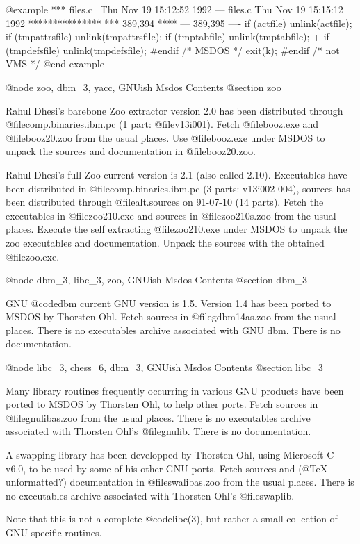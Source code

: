 @example
*** files.c~	Thu Nov 19 15:12:52 1992
--- files.c	Thu Nov 19 15:15:12 1992
***************
*** 389,394 ****
--- 389,395 ----
    if (actfile) unlink(actfile);
    if (tmpattrsfile) unlink(tmpattrsfile);
    if (tmptabfile) unlink(tmptabfile);
+   if (tmpdefsfile) unlink(tmpdefsfile);
  #endif /* MSDOS */
    exit(k);
  #endif /* not VMS */
@end example

@node zoo, dbm_3, yacc, GNUish Msdos Contents
@section zoo

Rahul Dhesi's barebone Zoo extractor version 2.0 has been distributed
through @file{comp.binaries.ibm.pc} (1 part: @file{v13i001}).  Fetch
@file{booz.exe} and @file{booz20.zoo} from the usual places.  Use
@file{booz.exe} under MSDOS to unpack the sources and documentation in
@file{booz20.zoo}.

Rahul Dhesi's full Zoo current version is 2.1 (also called 2.10).
Executables have been distributed in @file{comp.binaries.ibm.pc} (3
parts: v13i002-004), sources has been distributed through
@file{alt.sources} on 91-07-10 (14 parts).  Fetch the executables in
@file{zoo210.exe} and sources in @file{zoo210s.zoo} from the usual
places.  Execute the self extracting @file{zoo210.exe} under MSDOS to
unpack the zoo executables and documentation.  Unpack the sources with
the obtained @file{zoo.exe}.

@node dbm_3, libc_3, zoo, GNUish Msdos Contents
@section dbm_3

GNU @code{dbm} current GNU version is 1.5.  Version 1.4 has been ported
to MSDOS by Thorsten Ohl.  Fetch sources in @file{gdbm14as.zoo} from the
usual places.  There is no executables archive associated with GNU dbm.
There is no documentation.

@node libc_3, chess_6, dbm_3, GNUish Msdos Contents
@section libc_3

Many library routines frequently occurring in various GNU products have
been ported to MSDOS by Thorsten Ohl, to help other ports.  Fetch
sources in @file{gnulibas.zoo} from the usual places.  There is no
executables archive associated with Thorsten Ohl's @file{gnulib}.  There
is no documentation.

A swapping library has been developped by Thorsten Ohl, using Microsoft
C v6.0, to be used by some of his other GNU ports.  Fetch sources and
(@TeX{} unformatted?) documentation in @file{swalibas.zoo} from the
usual places.  There is no executables archive associated with Thorsten
Ohl's @file{swaplib}.

Note that this is not a complete @code{libc(3)}, but rather a small
collection of GNU specific routines.

